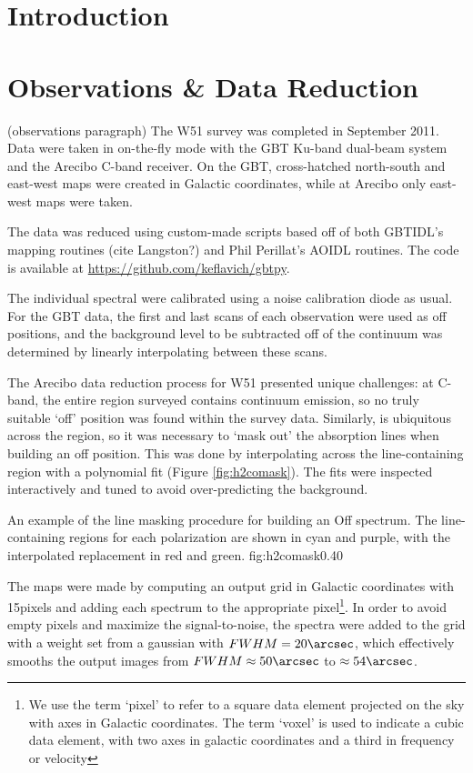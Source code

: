 

\section{Introduction}


\section{Observations \& Data Reduction}

(observations paragraph)
The W51 survey was completed in September 2011.  
Data were taken in on-the-fly mode with the GBT Ku-band dual-beam system
and the Arecibo C-band receiver.  On the GBT, cross-hatched north-south
and east-west maps were created in Galactic coordinates, while at Arecibo
only east-west maps were taken.

The data was reduced using custom-made scripts based off of both GBTIDL's mapping
routines (cite Langston?) and Phil Perillat's AOIDL routines.  The code is available
at \url{https://github.com/keflavich/gbtpy}.

The individual spectral were calibrated using a noise calibration diode as
usual.  For the GBT data, the first and last scans of each observation were
used as off positions, and the background level to be subtracted off of the
continuum was determined by linearly interpolating between these scans.

The Arecibo data reduction process for W51
presented unique challenges: at C-band, the entire region surveyed contains
continuum emission, so no truly suitable `off' position was found within the
survey data.  Similarly, \formaldehyde is ubiquitous across the region, so it
was necessary to `mask out' the absorption lines when building an off position.
This was done by interpolating across the line-containing region with a
polynomial fit (Figure \ref{fig:h2comask}).  The fits were inspected interactively
and tuned to avoid over-predicting the background.

{An example of the \formaldehyde line masking procedure for building an Off
spectrum.  The line-containing regions for each polarization are shown in cyan
and purple, with the interpolated replacement in red and green.
}{fig:h2comask}{0.4}{0}

The maps were made by computing an output grid in Galactic coordinates with
15\arcsec pixels and adding each spectrum to the appropriate pixel\footnote{We
use the term `pixel' to refer to a square data element projected on the sky
with axes in Galactic coordinates.  The term `voxel' is used to indicate a
cubic data element, with two axes in galactic coordinates and a third in
frequency or velocity}.  In order
to avoid empty pixels and maximize the signal-to-noise, the spectra were added
to the grid with a weight set from a gaussian with $FWHM=20\arcsec$, which
effectively smooths the output images from $FWHM\approx50\arcsec$ to
$\approx54\arcsec$.  

